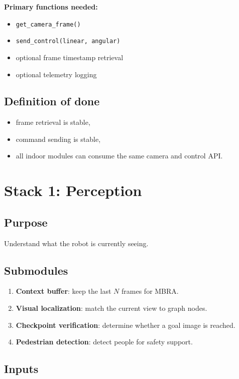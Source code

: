 \documentclass[11pt,a4paper]{article}
\begin{document}
\textbf{Primary functions needed:}
\begin{itemize}[nosep]
  \item \texttt{get\_camera\_frame()}
  \item \texttt{send\_control(linear, angular)}
  \item optional frame timestamp retrieval
  \item optional telemetry logging
\end{itemize}

\subsection{Definition of done}

\begin{itemize}[nosep]
  \item frame retrieval is stable,
  \item command sending is stable,
  \item all indoor modules can consume the same camera and control API.
\end{itemize}


\section{Stack 1: Perception}

\subsection{Purpose}

Understand what the robot is currently seeing.

\subsection{Submodules}

\begin{enumerate}[nosep]
  \item \textbf{Context buffer}: keep the last $N$ frames for MBRA.
  \item \textbf{Visual localization}: match the current view to graph nodes.
  \item \textbf{Checkpoint verification}: determine whether a goal image is reached.
  \item \textbf{Pedestrian detection}: detect people for safety support.
\end{enumerate}

\subsection{Inputs}
\end{document}
